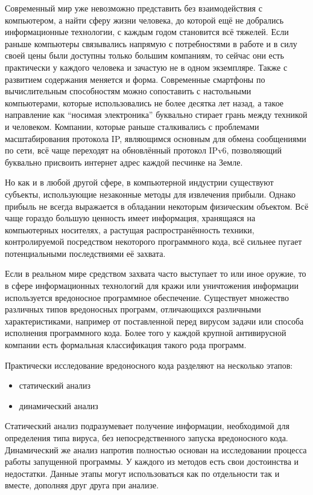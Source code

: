 
Современный мир уже невозможно представить без взаимодействия с компьютером, а найти сферу жизни человека, до которой ещё не добрались информационные технологии, с каждым годом становится всё тяжелей.
Если раньше компьютеры связывались напрямую с потребностями в работе и в силу своей цены были доступны только большим компаниям, то сейчас они есть практически у каждого человека и зачастую не в одном экземпляре.
Также с развитием содержания меняется и форма.
Современные смартфоны по вычислительным способностям можно сопоставить с настольными компьютерами, которые использовались не более десятка лет назад, а такое направление как “носимая электроника” буквально стирает грань между техникой и человеком.
Компании, которые раньше сталкивались с проблемами масштабирования протокола IP, являющимся основным для обмена сообщениями по сети, всё чаще переходят на обновлённый протокол IPv6, позволяющий буквально присвоить интернет адрес каждой песчинке на Земле.

Но как и в любой другой сфере, в компьютерной индустрии существуют субъекты, использующие незаконные методы для извлечения прибыли.
Однако прибыль не всегда выражается в обладании некоторым физическим объектом.
Всё чаще гораздо большую ценность имеет информация, хранящаяся на компьютерных носителях, а растущая распространённость техники, контролируемой посредством некоторого программного кода, всё сильнее пугает потенциальными последствиями её захвата.

Если в реальном мире средством захвата часто выступает то или иное оружие, то в сфере информационных технологий для кражи или уничтожения информации используется вредоносное программное обеспечение.
Существует множество различных типов вредоносных программ, отличающихся различными характеристиками, например от поставленной перед вирусом задачи или способа исполнения программного кода.
Более того у каждой крупной антивирусной компании есть формальная классификация такого рода программ.

Практически исследование вредоносного кода разделяют на несколько этапов:
\begin{itemize}
\item статический анализ
\item динамический анализ
\end{itemize}
Статический анализ подразумевает получение информации, необходимой для определения типа вируса, без непосредственного запуска вредоносного кода.
Динамический же анализ напротив полностью основан на исследовании процесса работы запущенной программы.
У каждого из методов есть свои достоинства и недостатки.
Данные этапы могут использоваться как по отдельности так и вместе, дополняя друг друга при анализе.

